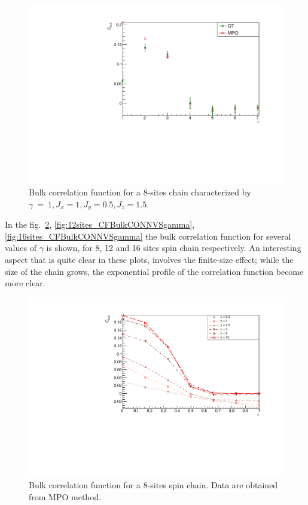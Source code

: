 \begin{figure}[H]
    \centering
    \includegraphics[scale=0.7]{Figures/8sites/CorrFuncBulkCONN_8sJ10515.pdf}
    \caption{Bulk correlation function for a 8-sites chain characterized by $\gamma~=~1, J_x=1, J_y=0.5, J_z=1.5$.}
    \label{fig:my_label}
\end{figure}

In the fig.~\ref{fig:8sites_CBulkConnVSgamma}, \ref{fig:12sites_CFBulkCONNVSgamma}, \ref{fig:16sites_CFBulkCONNVSgamma} the bulk correlation function for several values of $\gamma$ is shown, for 8, 12 and 16 sites spin chain respectively. An interesting aspect that is quite clear in these plots, involves the finite-size effect; while the size of the chain grows, the exponential profile of the correlation function become more clear. 

\begin{figure}[H]
    \centering
    \includegraphics[scale=0.7]{Figures/8sites_CBulkConnVSgamma.pdf}
    \caption{Bulk correlation function for a 8-sites spin chain. Data are obtained from MPO method.}
    \label{fig:8sites_CBulkConnVSgamma}
\end{figure}

